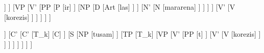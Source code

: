\documentclass{article}
\begin{document}
	\begin{forest}
		[S
			[NP
				[Pron
					[isam]
				]
			]
			[VP
				[V'
					[PP
						[P
							[ir]
						]
						[NP
							[D
								[Art
									[las]
								]
							]
							[N'
								[N
									[mararena]
								]
							]
						]
					]
					[V'
						[V
							[korezis]
						]
					]
				]
			]
		]
	\end{forest}
\qquad
	\begin{forest}
		[CP
			[PP
				[ir ke]
			]
			[C'
			[C'
				[T_k]
				[C]
			]
			[S
				[NP
					[tusam]
				]
				[TP
					[T_k]
					[VP
						[V'
							[PP
								[t]
							]
							[V'
								[V
									[korezis]
								]
							]
						]
					]
				]
			]
			]
		]
	\end{forest}
\end{document}
